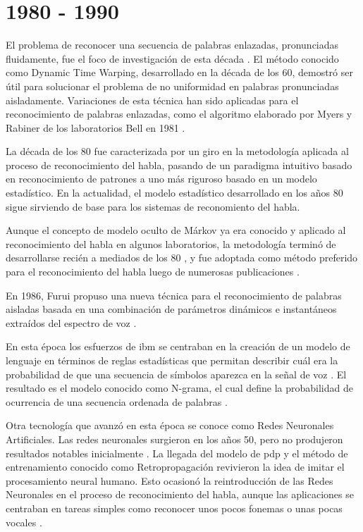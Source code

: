 \section{1980 - 1990}
\label{sec:80s}

El problema de reconocer una secuencia de palabras enlazadas, pronunciadas fluidamente, fue el foco
de investigaci\'{o}n de esta d\'{e}cada \cite{Furui50Years2004}. El m\'{e}todo conocido como 
Dynamic Time Warping, desarrollado en la d\'{e}cada de los 60, demostr\'{o} ser \'{u}til para solucionar el problema de no uniformidad
en palabras pronunciadas aisladamente. Variaciones de esta t\'{e}cnica han sido aplicadas para el 
reconocimiento de palabras enlazadas, como el algoritmo elaborado por Myers y Rabiner de los laboratorios Bell
en 1981 \cite{MyersALevel1981}.

La d\'{e}cada de los 80 fue caracterizada por un giro en la metodolog\'{i}a aplicada al proceso de
reconocimiento del habla, pasando de un paradigma intuitivo basado en reconocimiento de patrones 
a uno m\'{a}s riguroso basado en un modelo estad\'{i}stico. En la actualidad, el modelo estad\'{i}stico
desarrollado en los a\~{n}os 80 sigue sirviendo de base para los sistemas de reconomiento del habla.

Aunque el concepto de modelo oculto de M\'{a}rkov ya era conocido y aplicado al reconocimiento del habla 
en algunos laboratorios, la metodolog\'{i}a termin\'{o} de desarrollarse reci\'{e}n a mediados 
de los 80 \cite{JuangAutomaticSpeech}, y fue adoptada como m\'{e}todo preferido para el reconocimiento 
del habla luego de numerosas publicaciones \cite{LevinsonAnIntroduction1983, FergusonHidden1980}.

En 1986, Furui propuso una nueva t\'{e}cnica para el reconocimiento de palabras aisladas basada en
una combinaci\'{o}n de par\'{a}metros din\'{a}micos e instant\'{a}neos 
extra\'{i}dos del espectro de voz \cite{FuruiSpeaker1986}.

En esta \'{e}poca los esfuerzos de \gls{ibm} se centraban en la creaci\'{o}n de un modelo de lenguaje 
en t\'{e}rminos de reglas estad\'{i}sticas que permitan describir cu\'{a}l era la probabilidad de que una 
secuencia de s\'{i}mbolos aparezca en la se\~{n}al de voz \cite{Furui50Years2004}. El resultado es el
modelo conocido como N-grama, el cual define la probabilidad de ocurrencia de una secuencia ordenada
de palabras \cite{JelinekTheDevelopment1986}.

Otra tecnolog\'{i}a que avanz\'{o} en esta \'{e}poca se conoce como Redes Neuronales Artificiales. Las 
redes neuronales surgieron en los a\~{n}os 50, pero no produjeron resultados notables 
inicialmente \cite{JuangAutomaticSpeech}. La llegada del modelo de \gls{pdp} y el m\'{e}todo de entrenamiento conocido como Retropropagaci\'{o}n
revivieron la idea de imitar el procesamiento neural humano. Esto ocasion\'{o} la reintroducci\'{o}n de
las Redes Neuronales en el proceso de reconocimiento del habla, aunque las aplicaciones se centraban en tareas simples
como reconocer unos pocos fonemas o unas pocas vocales \cite{JuangAutomaticSpeech}.

